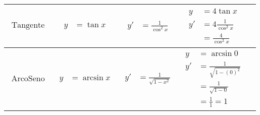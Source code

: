 \documentclass[../../main]{subfiles}
\begin{document}
\begin{center}
\begin{longtable}{ |p{7em}|p{5em}|p{5em}|p{7em}|p{5cm}| }
        \hline

        \begin{align*}
            \text{Tangente}
        \end{align*} &
        {
            \begin{align*}
                y&=\tan{x} 
            \end{align*}
        } &
        {
            \begin{align*}
                y'&=\frac{1}{\cos^2{x}} 
            \end{align*}
        } &
        {
            \begin{align*}
                y  & = 4 \tan{x}  \\
                y' & = 4 \frac{1}{\cos^2{x}}  \\
                    & = \frac{4}{\cos^2{x}} 
            \end{align*}
        } &
        {
        \begin{center}
        \end{center}
        } \\

        \hline
        
        \begin{align*}
            \text{ArcoSeno}
        \end{align*} &
        {
            \begin{align*}
                y&=\arcsin{x} 
            \end{align*}
        } &
        {
            \begin{align*}
                y'&= \frac{1}{\sqrt{1-x^2}} 
            \end{align*}
        } &
        {
            \begin{align*}
                y & =\arcsin{0}  \\
                y' & = \frac{1}{\sqrt{1-(0)^2}}  \\
                    & = \frac{1}{\sqrt{1-0}}  \\
                    & = \frac{1}{1} = 1 
            \end{align*}
        } &
        {
        \begin{center}
        \end{center}
        } \\

        \hline


\end{longtable}
\end{center}
\end{document}
